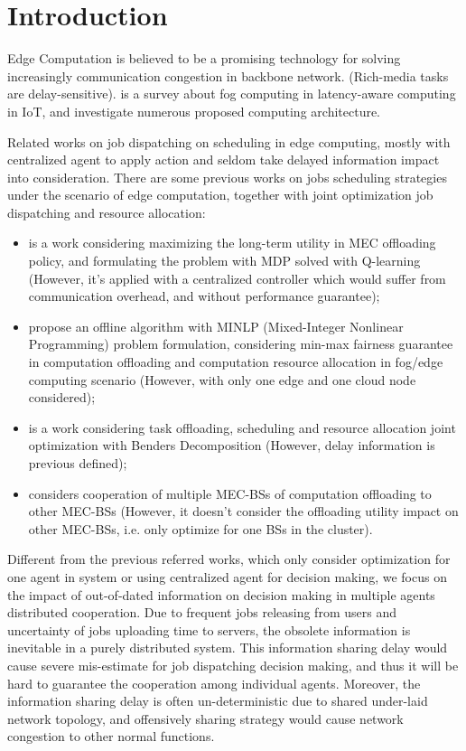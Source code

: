 
\section{Introduction}

Edge Computation is believed to be a promising technology for solving increasingly communication congestion in backbone network.
(Rich-media tasks are delay-sensitive).
\cite{Naha2018} is a survey about fog computing in latency-aware computing in IoT, and investigate numerous proposed computing architecture.


Related works on job dispatching on scheduling in edge computing, mostly with centralized agent to apply action and seldom take delayed information impact into consideration.
There are some previous works on jobs scheduling strategies under the scenario of edge computation, together with joint optimization job dispatching and resource allocation:
\begin{itemize}
    \item \cite{Zheng2019} is a work considering maximizing the long-term utility in MEC offloading policy, and formulating the problem with MDP solved with Q-learning (However, it's applied with a centralized controller which would suffer from communication overhead, and without performance guarantee);
    \item \cite{Du2018} propose an offline algorithm with MINLP (Mixed-Integer Nonlinear Programming) problem formulation, considering min-max fairness guarantee in computation offloading and computation resource allocation in fog/edge computing scenario (However, with only one edge and one cloud node considered);
    \item \cite{Alameddine2019} is a work considering task offloading, scheduling and resource allocation joint optimization with Benders Decomposition (However, delay information is previous defined);
    \item \cite{Fan2017} considers cooperation of multiple MEC-BSs of computation offloading to other MEC-BSs (However, it doesn't consider the offloading utility impact on other MEC-BSs, i.e. only optimize for one BSs in the cluster).
\end{itemize}


Different from the previous referred works, which only consider optimization for one agent in system or using centralized agent for decision making, we focus on the impact of out-of-dated information on decision making in multiple agents distributed cooperation.
Due to frequent jobs releasing from users and uncertainty of jobs uploading time to servers, the obsolete information is inevitable in a purely distributed system.
This information sharing delay would cause severe mis-estimate for job dispatching decision making, and thus it will be hard to guarantee the cooperation among individual agents.
Moreover, the information sharing delay is often un-deterministic due to shared under-laid network topology, and offensively sharing strategy would cause network congestion to other normal functions.


